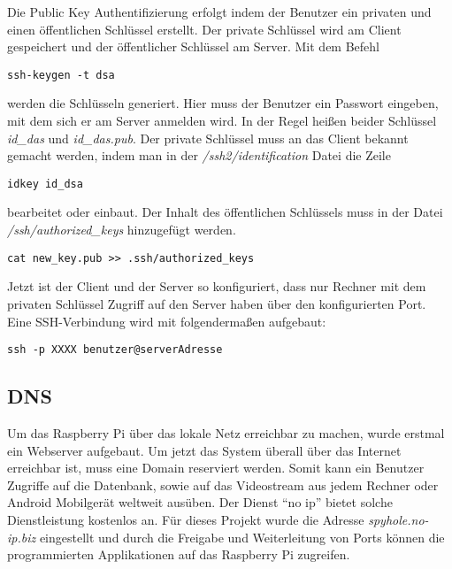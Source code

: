 Die Public Key Authentifizierung erfolgt indem der Benutzer ein privaten und einen öffentlichen Schlüssel erstellt. Der private Schlüssel wird am Client gespeichert und der öffentlicher Schlüssel am Server. Mit dem Befehl

\begin{lstlisting}
ssh-keygen -t dsa
\end{lstlisting}

werden die Schlüsseln generiert. Hier muss der Benutzer ein Passwort eingeben, mit dem sich er am Server anmelden wird. In der Regel heißen beider Schlüssel \textit{id\_das} und \textit{id\_das.pub}. Der private Schlüssel muss an das Client bekannt gemacht werden, indem man in der \textit{/ssh2/identification} Datei die Zeile 

\begin{lstlisting}
idkey id_dsa
\end{lstlisting}

bearbeitet oder einbaut. Der Inhalt des öffentlichen Schlüssels muss in der Datei \textit{/ssh/authorized\_keys} hinzugefügt werden.

\begin{lstlisting}
cat new_key.pub >> .ssh/authorized_keys
\end{lstlisting}

Jetzt ist der Client und der Server so konfiguriert, dass nur Rechner mit dem privaten Schlüssel Zugriff auf den Server haben über den konfigurierten Port.
Eine SSH-Verbindung wird mit folgendermaßen aufgebaut:
\begin{lstlisting}
ssh -p XXXX benutzer@serverAdresse
\end{lstlisting}

\subsection{DNS}
Um das Raspberry Pi über das lokale Netz erreichbar zu machen, wurde erstmal ein Webserver aufgebaut. Um jetzt das System überall über das Internet erreichbar ist, muss eine Domain reserviert werden. Somit kann ein Benutzer Zugriffe auf die Datenbank, sowie auf das Videostream aus jedem Rechner oder Android Mobilgerät weltweit ausüben. Der Dienst ``no ip'' bietet solche Dienstleistung kostenlos an. Für dieses Projekt wurde die Adresse \textit{spyhole.no-ip.biz} eingestellt und durch die Freigabe und Weiterleitung von Ports können die programmierten Applikationen auf das Raspberry Pi zugreifen.\\

